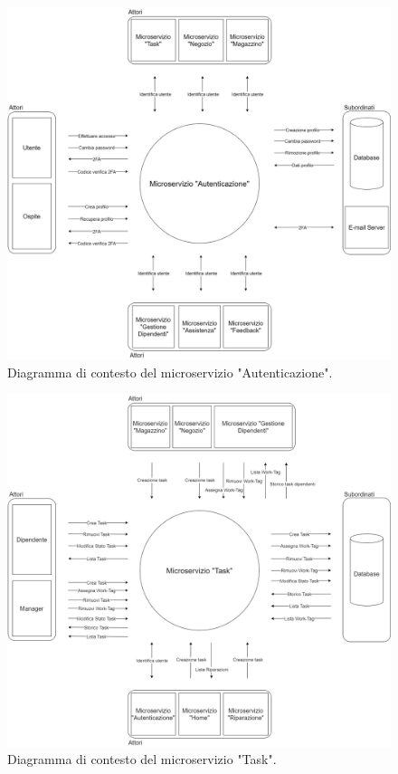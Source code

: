\documentclass{report}
\begin{document}
\begin{figure}[H]
	\centering\includegraphics[width=1\textwidth]{images/Diagrammi_Contesto/Diagramma_Contesto_Autenticazione.png}
	Diagramma di contesto del microservizio "Autenticazione".
\end{figure}

\begin{figure}[H]
	\centering\includegraphics[width=1\textwidth]{images/Diagrammi_Contesto/Diagramma_Contesto_Task.png}
	Diagramma di contesto del microservizio "Task".
\end{figure}
\end{document}

